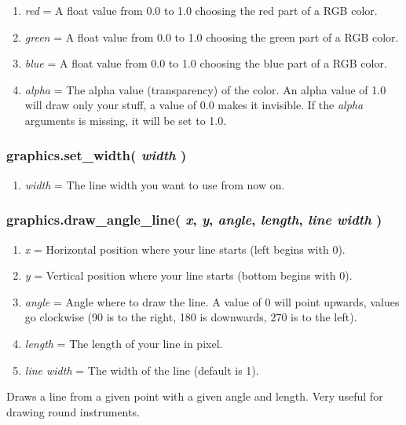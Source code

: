 \documentclass[11pt,parskip=half,a4paper]{scrartcl}
\begin{document}
\begin{enumerate}
	\item \emph{red} = A float value from 0.0 to 1.0 choosing the red part of a RGB color.
	\item \emph{green} = A float value from 0.0 to 1.0 choosing the green part of a RGB color.
	\item \emph{blue} = A float value from 0.0 to 1.0 choosing the blue part of a RGB color.
	\item \emph{alpha} = The alpha value (transparency) of the color. An alpha value of 1.0 will draw only your stuff, a value of 0.0 makes it invisible. If the \emph{alpha} arguments is missing, it will be set to 1.0.
\end{enumerate}

\subsubsection{graphics.set\_width( \emph{width} )}

\begin{enumerate}
	\item \emph{width} = The line width you want to use from now on.
\end{enumerate}

\subsubsection{graphics.draw\_angle\_line( \emph{x}, \emph{y}, \emph{angle}, \emph{length}, \emph{line width} )}

\begin{enumerate}
	\item \emph{x} = Horizontal position where your line starts (left begins with 0).
	\item \emph{y} = Vertical position where your line starts (bottom begins with 0).
	\item \emph{angle} = Angle where to draw the line. A value of 0 will point upwards, values go clockwise (90 is to the right, 180 is downwards, 270 is to the left).
	\item \emph{length} = The length of your line in pixel.
	\item \emph{line width} = The width of the line (default is 1).

\end{enumerate}

Draws a line from a given point with a given angle and length. Very useful for drawing round instruments.
\end{document}
